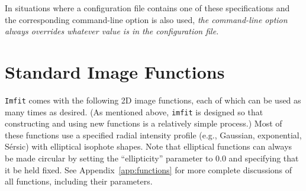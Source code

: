 \documentclass[10pt,a4paper,article]{memoir}
\newcommand{\imfit}{\texttt{imfit}}
\newcommand{\Imfit}{\texttt{Imfit}}
\begin{document}
In situations where a configuration file contains one of these specifications
and the corresponding command-line option is also used, \textit{the command-line option
always overrides whatever value is  in the configuration file.}



\chapter{Standard Image Functions}

\Imfit{} comes with the following 2D image functions, each of
which can be used as many times as desired. (As mentioned above, \imfit{}
is designed so that constructing and using new functions is a relatively
simple process.) Most of these functions use a specified radial intensity
profile (e.g., Gaussian, exponential, S{\'e}rsic) with elliptical isophote
shapes. Note that elliptical functions can always be made circular
by setting the ``ellipticity'' parameter to 0.0 and specifying that it be
held fixed. See Appendix~\ref{app:functions} for more complete discussions of all
functions, including their parameters.
\end{document}
